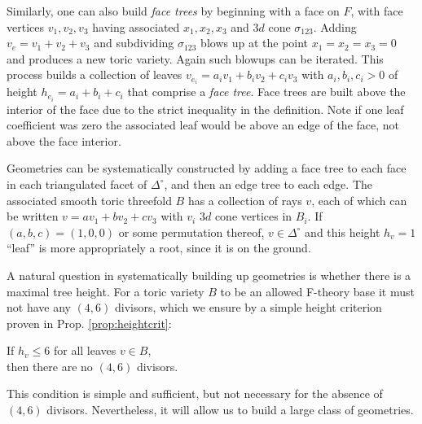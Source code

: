\documentclass[aps,prl,twocolumn, superscriptaddress,groupedaddress,nofootinbib]{revtex4-1}
\begin{document}
Similarly, one can also build \emph{face trees} by beginning
with a face on $F$, with face vertices
$v_1, v_2, v_3$ having associated $x_1, x_2, x_3$ and $3d$
cone $\sigma_{123}$. Adding $v_e=v_1+v_2+v_3$ and subdividing
$\sigma_{123}$ blows up at the point $x_1=x_2=x_3=0$  and produces a new toric variety. Again such
blowups can be iterated. This process builds a collection of
leaves
$v_{e_i}=a_i v_1 + b_i v_2 + c_i v_3$ with $a_i,b_i,c_i > 0$ of
height $h_{e_i}=a_i+b_i+c_i$ that comprise
a \emph{face tree}. Face trees are built above the interior of the face
due to the strict inequality in the definition. Note
if one leaf coefficient was zero the associated leaf would be above an edge
of the face, not above the face interior.

Geometries can be systematically constructed by adding a face tree to each face in each triangulated facet of $\Delta^\circ$, and then an edge tree to each edge. The associated smooth toric
threefold $B$ has a collection of rays $v$, each of which can be written $v=av_1+bv_2+cv_3$ with $v_i$ $3d$ cone vertices in $B_i$. If $(a,b,c)=(1,0,0)$ or some
permutation thereof, $v\in \Delta^\circ$ and this height $h_v=1$ ``leaf'' is more
appropriately a root, since it is on the ground.

A natural question
in systematically building up geometries is whether there is
a maximal tree height. For a toric variety $B$ to be an allowed
F-theory base it must not have any $(4,6)$ divisors, which
we ensure by a simple height criterion proven in Prop. \ref{prop:heightcrit}:
\begin{center}
If $h_v\leq 6$ for all leaves $v\in B$, \\ then there are no $(4,6)$
divisors.
\end{center}
This condition is simple and sufficient, but not necessary
for the absence of $(4,6)$ divisors. Nevertheless, it
will allow us to build a large class of geometries.
\end{document}
